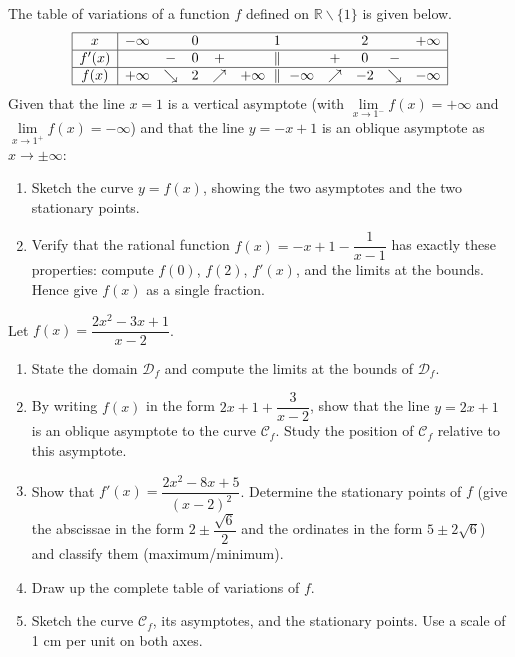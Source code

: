 \documentclass[11pt]{article}
\newcounter{popsec}
\newcounter{popsub}
\newcommand{\courssub}[1]{%
  \stepcounter{popsub}%
  \par\vspace{9pt}\noindent{\popxbold\fontsize{11.5}{13}\selectfont\color{popink}{\color{poporange}\thepopsec.\thepopsub}\hspace{6pt}#1}\par\nopagebreak\vspace{4pt}
}
\def\setminus{\mathbin{\backslash}}\let\smallsetminus\setminus
\begin{document}
\begin{exercice}
The table of variations of a function $f$ defined on $\mathbb{R} \setminus \{1\}$ is given below.
\[
\begin{array}{|c|ccccccccc|}
\hline
x & -\infty & & 0 & & 1 & & 2 & & +\infty \\
\hline
f'(x) & & - & 0 & + & \parallel & + & 0 & - & \\
\hline
f(x) & +\infty & \searrow & 2 & \nearrow & +\infty\ \parallel\ -\infty & \nearrow & -2 & \searrow & -\infty \\
\hline
\end{array}
\]
Given that the line $x = 1$ is a vertical asymptote (with $\lim\limits_{x \to 1^-} f(x) = +\infty$ and $\lim\limits_{x \to 1^+} f(x) = -\infty$) and that the line $y = -x + 1$ is an oblique asymptote as $x \to \pm\infty$:
\begin{enumerate}
    \item Sketch the curve $y = f(x)$, showing the two asymptotes and the two stationary points.
    \item Verify that the rational function $f(x) = -x + 1 - \dfrac{1}{x-1}$ has exactly these properties: compute $f(0)$, $f(2)$, $f'(x)$, and the limits at the bounds. Hence give $f(x)$ as a single fraction.
\end{enumerate}
\end{exercice}

\courssub{I practise}

\begin{exercice}
Let $f(x) = \dfrac{2x^2 - 3x + 1}{x - 2}$.
\begin{enumerate}
    \item State the domain $\mathcal{D}_f$ and compute the limits at the bounds of $\mathcal{D}_f$.
    \item By writing $f(x)$ in the form $2x + 1 + \dfrac{3}{x-2}$, show that the line $y = 2x + 1$ is an oblique asymptote to the curve $\mathcal{C}_f$. Study the position of $\mathcal{C}_f$ relative to this asymptote.
    \item Show that $f'(x) = \dfrac{2x^2 - 8x + 5}{(x-2)^2}$. Determine the stationary points of $f$ (give the abscissae in the form $2 \pm \dfrac{\sqrt{6}}{2}$ and the ordinates in the form $5 \pm 2\sqrt{6}$) and classify them (maximum/minimum).
    \item Draw up the complete table of variations of $f$.
    \item Sketch the curve $\mathcal{C}_f$, its asymptotes, and the stationary points. Use a scale of 1 cm per unit on both axes.
\end{enumerate}
\end{exercice}
\end{document}
